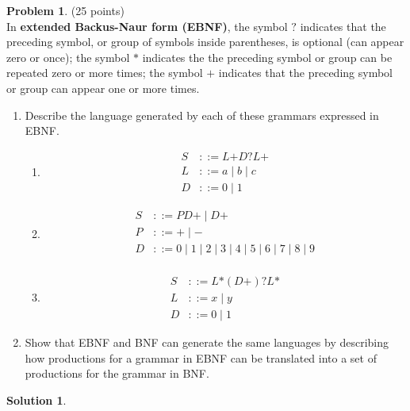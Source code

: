 \documentclass{article}
\theoremstyle{definition}
\newtheorem{problem}{Problem}
\newtheorem*{solution}{Solution}
\begin{document}
\newpage

\begin{problem} (25 points)\\
In \textbf{extended Backus-Naur form (EBNF)}, the symbol $?$ indicates that the preceding symbol, or group of symbols inside parentheses, is optional (can appear zero or once); the symbol $*$ indicates the the preceding symbol or group can be repeated zero or more times; the symbol $+$ indicates that the preceding symbol or group can appear one or more times.
\begin{enumerate}
\item Describe the language generated by each of these grammars expressed in EBNF.
\begin{enumerate}
\item
\begin{align*}
S & ::= L\text{+}D\text{?}L\text{+}\\
L & ::= a \mid b \mid c\\
D & ::= 0 \mid 1
\end{align*}
\item
\begin{align*}
S & ::= PD\text{+} \mid D\text{+}\\
P & ::= + \mid -\\
D & ::= 0 \mid 1 \mid 2 \mid 3 \mid 4 \mid 5 \mid 6 \mid 7 \mid 8 \mid 9\\
\end{align*}
\item
\begin{align*}
S & ::= L\text{*}(D\text{+})\text{?}L\text{*}\\
L & ::= x \mid y\\
D & ::= 0 \mid 1
\end{align*}
\end{enumerate}
\item Show that EBNF and BNF can generate the same languages by describing how productions for a grammar in EBNF can be translated into a set of productions for the grammar in BNF.
\end{enumerate}
\end{problem}

\begin{solution}\ \\


\end{solution}

\newpage
\end{document}
